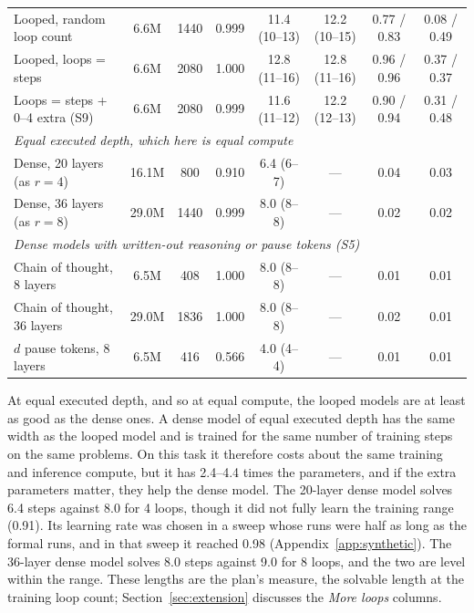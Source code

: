 \begin{table}[t]
\begin{tabular}{lccccccc}
    Looped, random loop count     & 6.6M & 1440 & 0.999 & 11.4 (10--13) & 12.2 (10--15) & 0.77 / 0.83 & 0.08 / 0.49 \\
    Looped, loops = steps         & 6.6M & 2080 & 1.000 & 12.8 (11--16) & 12.8 (11--16) & 0.96 / 0.96 & 0.37 / 0.37 \\
    Loops = steps + 0--4 extra (S9) & 6.6M & 2080 & 0.999 & 11.6 (11--12) & 12.2 (12--13) & 0.90 / 0.94 & 0.31 / 0.48 \\
    \midrule
    \multicolumn{8}{l}{\emph{Equal executed depth, which here is equal compute}} \\
    Dense, 20 layers (as $r=4$)   & 16.1M & 800  & 0.910 & 6.4 (6--7)  & ---           & 0.04        & 0.03        \\
    Dense, 36 layers (as $r=8$)   & 29.0M & 1440 & 0.999 & 8.0 (8--8)  & ---           & 0.02        & 0.02        \\
    \midrule
    \multicolumn{8}{l}{\emph{Dense models with written-out reasoning or pause tokens (S5)}} \\
    Chain of thought, 8 layers   & 6.5M  & 408  & 1.000 & 8.0 (8--8) & ---          & 0.01        & 0.01        \\
    Chain of thought, 36 layers  & 29.0M & 1836 & 1.000 & 8.0 (8--8) & ---          & 0.02        & 0.01        \\
    $d$ pause tokens, 8 layers   & 6.5M  & 416  & 0.566 & 4.0 (4--4) & ---          & 0.01        & 0.01        \\
    \bottomrule
  \end{tabular}
\end{table}

At equal executed depth, and so at equal compute, the looped models are at least as good as the dense ones. A dense
model of equal executed depth has the same width as the looped model and is trained for the same number of training
steps on the same problems. On this task it therefore costs about the same training and inference compute, but it has
2.4--4.4 times the parameters, and if the extra parameters matter, they help the dense model. The 20-layer dense model
solves 6.4 steps against 8.0 for 4 loops, though it did not fully learn the training range (0.91). Its learning rate
was chosen in a sweep whose runs were half as long as the formal runs, and in that sweep it reached 0.98
(Appendix~\ref{app:synthetic}). The 36-layer dense model solves 8.0 steps against 9.0 for 8 loops, and the two are
level within the range. These lengths are the plan's measure, the solvable length at the training loop count;
Section~\ref{sec:extension} discusses the \emph{More loops} columns.

